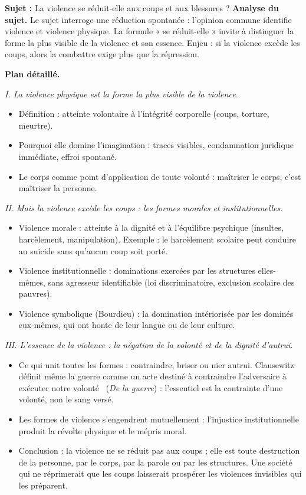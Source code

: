\documentclass[11pt]{article}
\begin{document}
\begin{exoresolu}
\textbf{Sujet :} La violence se réduit-elle aux coups et aux blessures ?
\tcblower
\textbf{Analyse du sujet.} Le sujet interroge une réduction spontanée : l'opinion commune identifie violence et violence physique. La formule « se réduit-elle » invite à distinguer la forme la plus visible de la violence et son essence. Enjeu : si la violence excède les coups, alors la combattre exige plus que la répression.

\textbf{Plan détaillé.}

\emph{I. La violence physique est la forme la plus visible de la violence.}
\begin{itemize}
\item Définition : atteinte volontaire à l'intégrité corporelle (coups, torture, meurtre).
\item Pourquoi elle domine l'imagination : traces visibles, condamnation juridique immédiate, effroi spontané.
\item Le corps comme point d'application de toute volonté : maîtriser le corps, c'est maîtriser la personne.
\end{itemize}

\emph{II. Mais la violence excède les coups : les formes morales et institutionnelles.}
\begin{itemize}
\item Violence morale : atteinte à la dignité et à l'équilibre psychique (insultes, harcèlement, manipulation). Exemple : le harcèlement scolaire peut conduire au suicide sans qu'aucun coup soit porté.
\item Violence institutionnelle : dominations exercées par les structures elles-mêmes, sans agresseur identifiable (loi discriminatoire, exclusion scolaire des pauvres).
\item Violence symbolique (Bourdieu) : la domination intériorisée par les dominés eux-mêmes, qui ont honte de leur langue ou de leur culture.
\end{itemize}

\emph{III. L'essence de la violence : la négation de la volonté et de la dignité d'autrui.}
\begin{itemize}
\item Ce qui unit toutes les formes : contraindre, briser ou nier autrui. Clausewitz définit même la guerre comme un acte destiné à \guillemotleft contraindre l'adversaire à exécuter notre volonté \guillemotright\ (\emph{De la guerre}) : l'essentiel est la contrainte d'une volonté, non le sang versé.
\item Les formes de violence s'engendrent mutuellement : l'injustice institutionnelle produit la révolte physique et le mépris moral.
\item Conclusion : la violence ne se réduit pas aux coups ; elle est toute destruction de la personne, par le corps, par la parole ou par les structures. Une société qui ne réprimerait que les coups laisserait prospérer les violences invisibles qui les préparent.
\end{itemize}
\end{exoresolu}
\end{document}
